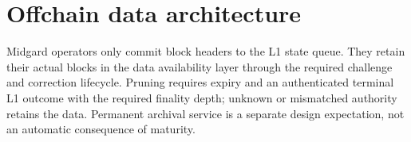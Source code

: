 \documentclass[../midgard.tex]{subfiles}
\begin{document}
\chapter{Offchain data architecture}
\label{h:offchain-data-architecture}

Midgard operators only commit block headers to the L1 state queue.
They retain their actual blocks in the data availability layer through the required challenge and correction lifecycle. Pruning requires expiry and an authenticated terminal L1 outcome with the required finality depth; unknown or mismatched authority retains the data. Permanent archival service is a separate design expectation, not an automatic consequence of maturity.
\end{document}
